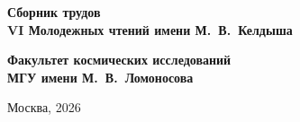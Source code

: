 \documentclass[10pt,reqno,intlimits,twoside]{amsart}
\begin{document}
    \thispagestyle{empty}
    \begin{center}
    \Huge     {\textbf{Сборник трудов}}\\
        \bigskip
    \LARGE     {\textbf {VI Молодежных чтений имени М.~В.~Келдыша}}
    \end{center}
   \vspace{6cm}
   \begin{center}
    \LARGE    {\textbf {Факультет космических исследований\\ 
       МГУ имени М.~В.~Ломоносова}}
   \end{center}
    \vspace*{\fill}
    \begin{center}
        \large {Москва, 2026}
    \end{center}
    \newpage
    \tableofcontents
    \newpage
    
    

    
\end{document}
